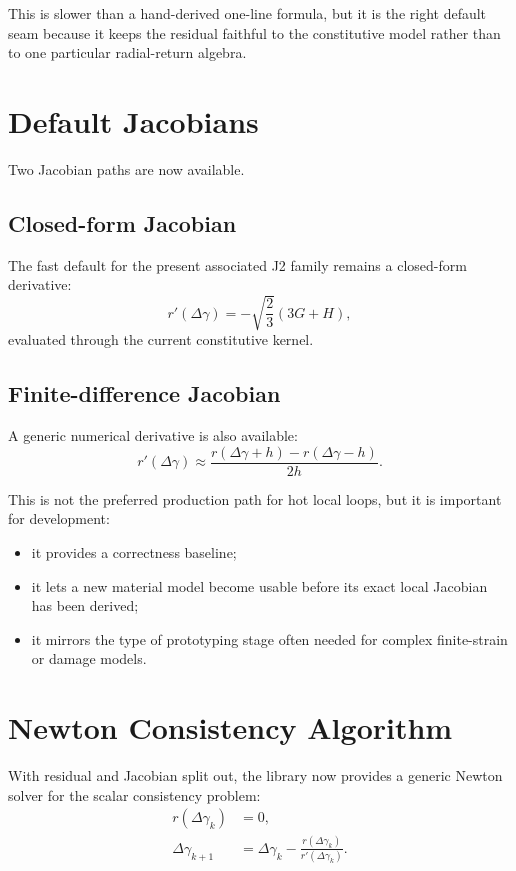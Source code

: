This is slower than a hand-derived one-line formula, but it is the right
default seam because it keeps the residual faithful to the constitutive model
rather than to one particular radial-return algebra.

\section{Default Jacobians}

Two Jacobian paths are now available.

\subsection*{Closed-form Jacobian}

The fast default for the present associated J2 family remains a closed-form
derivative:
\[
  r'(\Delta\gamma)
  = -\sqrt{\frac{2}{3}}\left(3G + H\right),
\]
evaluated through the current constitutive kernel.

\subsection*{Finite-difference Jacobian}

A generic numerical derivative is also available:
\[
  r'(\Delta\gamma)
  \approx
  \frac{r(\Delta\gamma + h) - r(\Delta\gamma - h)}{2h}.
\]

This is not the preferred production path for hot local loops, but it is
important for development:
\begin{itemize}
  \item it provides a correctness baseline;
  \item it lets a new material model become usable before its exact local
        Jacobian has been derived;
  \item it mirrors the type of prototyping stage often needed for complex
        finite-strain or damage models.
\end{itemize}

\section{Newton Consistency Algorithm}

With residual and Jacobian split out, the library now provides a generic Newton
solver for the scalar consistency problem:
\begin{align}
  r(\Delta\gamma_k) &= 0, \\
  \Delta\gamma_{k+1}
    &= \Delta\gamma_k - \frac{r(\Delta\gamma_k)}{r'(\Delta\gamma_k)}.
\end{align}

